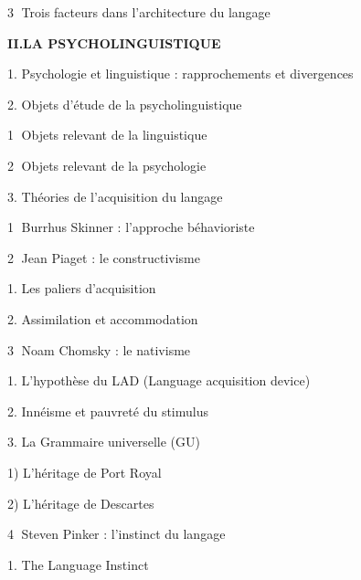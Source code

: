 \begin{keybox}
\hspace*{2em}\textcircled{\scriptsize 3} Trois facteurs dans l’architecture du langage\par
\medskip
\textbf{II.\quad LA PSYCHOLINGUISTIQUE}\par
\hspace*{1em}1. Psychologie et linguistique : rapprochements et divergences\par
\hspace*{1em}2. Objets d’étude de la psycholinguistique\par
\hspace*{2em}\textcircled{\scriptsize 1} Objets relevant de la linguistique\par
\hspace*{2em}\textcircled{\scriptsize 2} Objets relevant de la psychologie\par
\hspace*{1em}3. Théories de l’acquisition du langage\par
\hspace*{2em}\textcircled{\scriptsize 1} Burrhus Skinner : l’approche béhavioriste\par
\hspace*{2em}\textcircled{\scriptsize 2} Jean Piaget : le constructivisme\par
\hspace*{3em}1. Les paliers d’acquisition\par
\hspace*{3em}2. Assimilation et accommodation\par
\hspace*{2em}\textcircled{\scriptsize 3} Noam Chomsky : le nativisme\par
\hspace*{3em}1. L’hypothèse du LAD (Language acquisition device)\par
{}
\hspace*{3em}2. Innéisme et pauvreté du stimulus\par
\hspace*{3em}3. La Grammaire universelle (GU)\par
\hspace*{4em}1) L’héritage de Port Royal\par
\hspace*{4em}2) L’héritage de Descartes\par
\hspace*{2em}\textcircled{\scriptsize 4} Steven Pinker : l’instinct du langage\par
\hspace*{3em}1. The Language Instinct\par

\end{keybox}
